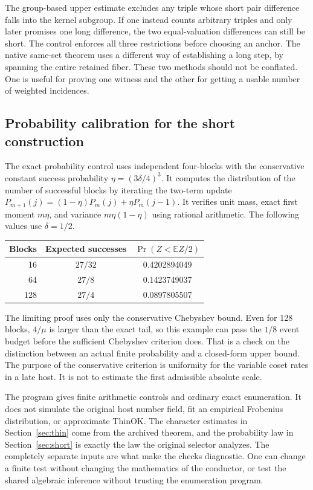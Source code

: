 \documentclass[12pt,letterpaper]{article}
\DeclareRobustCommand{\id}[1]{\mbox{\small\ttfamily #1}}
\begin{document}
The group-based upper estimate excludes any triple whose short pair difference falls into the kernel subgroup. If one instead counts arbitrary triples and only later promises one long difference, the two equal-valuation differences can still be short. The control enforces all three restrictions before choosing an anchor. The native same-set theorem uses a different way of establishing a long step, by spanning the entire retained fiber. These two methods should not be conflated. One is useful for proving one witness and the other for getting a usable number of weighted incidences.

\subsection{Probability calibration for the short construction}

The exact probability control uses independent four-blocks with the conservative constant success probability \(\eta=(3\delta/4)^3\). It computes the distribution of the number of successful blocks by iterating the two-term update \(P_{m+1}(j)=(1-\eta)P_m(j)+\eta P_m(j-1)\). It verifies unit mass, exact first moment \(m\eta\), and variance \(m\eta(1-\eta)\) using rational arithmetic. The following values use \(\delta=1/2\).
\begin{center}
\begin{tabular}{@{}rcc@{}}
\toprule
Blocks & Expected successes & \(\Pr(Z<\mathbb E Z/2)\)\\
\midrule
16&\(27/32\)&0.4202894049\\
64&\(27/8\)&0.1423749037\\
128&\(27/4\)&0.0897805507\\
\bottomrule
\end{tabular}
\end{center}
The limiting proof uses only the conservative Chebyshev bound. Even for 128 blocks, \(4/\mu\) is larger than the exact tail, so this example can pass the \(1/8\) event budget before the sufficient Chebyshev criterion does. That is a check on the distinction between an actual finite probability and a closed-form upper bound. The purpose of the conservative criterion is uniformity for the variable coset rates in a late host. It is not to estimate the first admissible absolute scale.

The program gives finite arithmetic controls and ordinary exact enumeration. It does not simulate the original host number field, fit an empirical Frobenius distribution, or approximate \id{ThinOK}. The character estimates in Section~\ref{sec:thin} come from the archived theorem, and the probability law in Section~\ref{sec:short} is exactly the law the original selector analyzes. The completely separate inputs are what make the checks diagnostic. One can change a finite test without changing the mathematics of the conductor, or test the shared algebraic inference without trusting the enumeration program.
\end{document}
